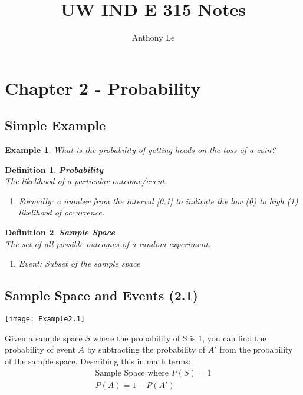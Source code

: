 \documentclass[../IND E 315.tex]{subfiles}
\title{UW IND E 315 Notes}
\author{Anthony Le}
\newtheorem{exmp}{Example}
\newtheorem{defn}{Definition}
\begin{document}
\pagestyle{fancy}
\fancyhead{}


\section*{Chapter 2 - Probability}
\subsection*{Simple Example}
\begin{exmp}
    What is the probability of getting heads on the toss of a coin?
\end{exmp}
\begin{defn}
    \textbf{Probability} \\
    The likelihood of a particular outcome/event.
    \begin{enumerate}
        \item Formally: a number from the interval [0,1] to indivate the low (0) to high (1) likelihood of occurrence.
    \end{enumerate}
\end{defn}

\begin{defn}
    \textbf{Sample Space} \\
    The set of all possible outcomes of a random experiment.
    \begin{enumerate}
        \item Event: Subset of the sample space
    \end{enumerate}
\end{defn}

\subsection*{Sample Space and Events (2.1)}
    \begin{center}
        \texttt{[image: Example2.1]}
    \end{center}
Given a sample space $S$ where the probability of S is 1, you can find the probability of event $A$ by subtracting the probability of $A'$ from the probability of the sample space. Describing this in math terms:
\begin{equation*}
    \begin{aligned}
        \text{Sample Space where } P(S) = 1 \\
        P(A) = 1- P(A')
    \end{aligned}
\end{equation*}
\end{document}
